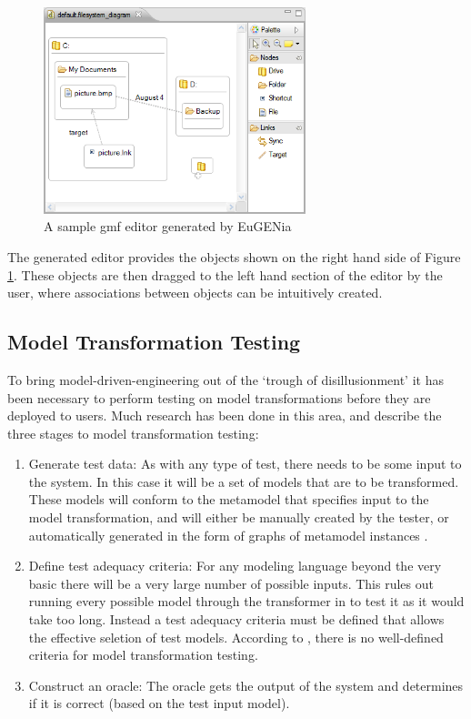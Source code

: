 \begin{figure}
\begin{center}
	\includegraphics[width=3in]{figures/gmfeditor.png}
\end{center}
\caption{A sample gmf editor generated by EuGENia \citep{eugeniaSite}}
\label{sampleGmf}
\end{figure}

The generated editor provides the objects shown on the right hand side of Figure \ref{sampleGmf}. These objects are then dragged to the left hand section of the editor by the user, where associations between objects can be intuitively created.

\subsection{Model Transformation Testing}

To bring model-driven-engineering out of the `trough of disillusionment' it has been necessary to perform testing on model transformations before they are deployed to users. Much research has been done in this area, and \citet{mttBarriers} describe the three stages to model transformation testing:

\begin{enumerate}
	\item Generate test data: As with any type of test, there needs to be some input to the system. In this case it will be a set of models that are to be transformed. These models will conform to the metamodel that specifies input to the model transformation, and will either be manually created by the tester, or automatically generated in the form of graphs of metamodel instances \citep{mttBarriers}.
	\item Define test adequacy criteria: For any modeling language beyond the very basic there will be a very large number of possible inputs. This rules out running every possible model through the transformer in to test it as it would take too long. Instead a test adequacy criteria must be defined that allows the effective seletion of test models. According to \citet{mttBarriers}, there is no well-defined criteria for model transformation testing.
	\item Construct an oracle: The oracle gets the output of the system and determines if it is correct (based on the test input model).
\end{enumerate}

